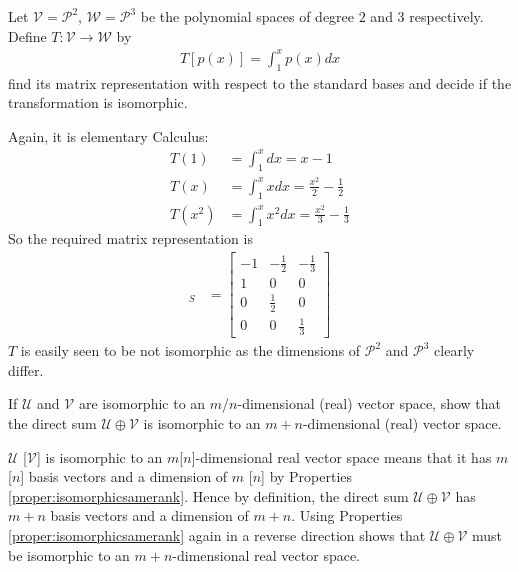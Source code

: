 \begin{Exercise}
Let $\mathcal{V} = \mathcal{P}^2$, $\mathcal{W} = \mathcal{P}^3$ be the polynomial spaces of degree $2$ and $3$ respectively. Define $T: \mathcal{V} \to \mathcal{W}$ by
\begin{align*}
T[p(x)] = \int_1^x p(x) dx
\end{align*}
find its matrix representation with respect to the standard bases and decide if the transformation is isomorphic.
\end{Exercise}
\begin{Answer}
Again, it is elementary Calculus:
\begin{align*}
T(1) &= \int_1^x dx = x-1 \\
T(x) &= \int_1^x x dx = \frac{x^2}{2} - \frac{1}{2} \\
T(x^2) &= \int_1^x x^2 dx = \frac{x^2}{3} - \frac{1}{3}
\end{align*}
So the required matrix representation is
\begin{align*}
[T]_S &=
\begin{bmatrix}
-1 & -\frac{1}{2} & -\frac{1}{3} \\
1 & 0 & 0 \\
0 & \frac{1}{2} & 0 \\
0 & 0 & \frac{1}{3}
\end{bmatrix}
\end{align*}
$T$ is easily seen to be not isomorphic as the dimensions of $\mathcal{P}^2$ and $\mathcal{P}^3$ clearly differ. 
\end{Answer}

\begin{Exercise}
If $\mathcal{U}$ and $\mathcal{V}$ are isomorphic to an $m$/$n$-dimensional (real) vector space, show that the direct sum $\mathcal{U} \oplus \mathcal{V}$ is isomorphic to an $m+n$-dimensional (real) vector space.
\end{Exercise}
\begin{Answer}
$\mathcal{U}$ [$\mathcal{V}$] is isomorphic to an $m$[$n$]-dimensional real vector space means that it has $m$ [$n$] basis vectors and a dimension of $m$ [$n$] by Properties \ref{proper:isomorphicsamerank}. Hence by definition, the direct sum $\mathcal{U} \oplus \mathcal{V}$ has $m+n$ basis vectors and a dimension of $m+n$. Using Properties \ref{proper:isomorphicsamerank} again in a reverse direction shows that $\mathcal{U} \oplus \mathcal{V}$ must be isomorphic to an $m+n$-dimensional real vector space.
\end{Answer}

